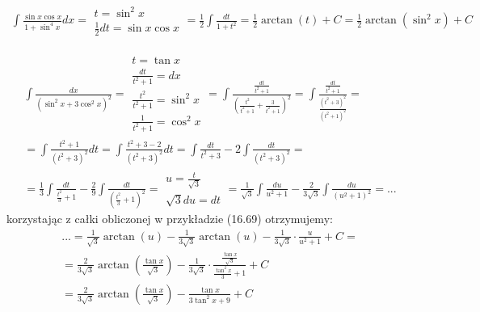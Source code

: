 
\begin{gather*}\int \frac{\sin x \cos x}{1+\sin^4 x}dx = \begin{array}{|l|} t=\sin^2x \\ \frac{1}{2}dt=\sin x\cos x \end{array} = \frac{1}{2}\int \frac{dt}{1+t^2} = \frac{1}{2}\arctan (t)+C = \frac{1}{2}\arctan(\sin^2x)+C \end{gather*}



\begin{gather*}\int \frac{dx}{(\sin^2 x + 3\cos^2 x)^2} = \begin{array}{|l|}
t=\tan x \\
\frac{dt}{t^2+1}=dx \\
\frac{t^2}{t^2+1}=\sin^2 x \\
\frac{1}{t^2+1}=\cos^2 x
\end{array} = \int \frac{\frac{dt}{t^2+1}}{(\frac{t^2}{t^2+1}+\frac{3}{t^2+1})^2} = \int \frac{\frac{dt}{t^2+1}}{\frac{(t^2+3)^2}{(t^2+1)^2}} =  \\
= \int \frac{t^2+1}{(t^2+3)^2}dt =  \int \frac{t^2+3-2}{(t^2+3)^2}dt = \int \frac{dt}{t^2+3}-2\int \frac{dt}{(t^2+3)^2} =  \\
= \frac{1}{3}\int \frac{dt}{\frac{t^2}{3}+1}-\frac{2}{9}\int \frac{dt}{(\frac{t^2}{3}+1)^2} = \begin{array}{|l|} u=\frac{t}{\sqrt{3}} \\ \sqrt{3}du=dt \end{array} = \frac{1}{\sqrt{3}}\int \frac{du}{u^2+1}-\frac{2}{3\sqrt{3}}\int \frac{du}{(u^2+1)^2}=...\end{gather*}
korzystając z całki obliczonej w przykładzie (16.69) otrzymujemy:
\begin{gather*}\nonumber ...=\frac{1}{\sqrt{3}}\arctan (u)-\frac{1}{3\sqrt{3}}\arctan (u) -\frac{1}{3\sqrt{3}}\cdot \frac{u}{u^2+1}+C = \\
= \frac{2}{3\sqrt{3}}\arctan \left(\frac{\tan x}{\sqrt{3}}\right) - \frac{1}{3\sqrt{3}}\cdot \frac{\frac{\tan x}{\sqrt{3}}}{\frac{\tan^2 x}{3}+1}+C \\
= \frac{2}{3\sqrt{3}}\arctan \left(\frac{\tan x}{\sqrt{3}}\right) - \frac{\tan x}{3\tan^2 x+9}+C\end{gather*}



